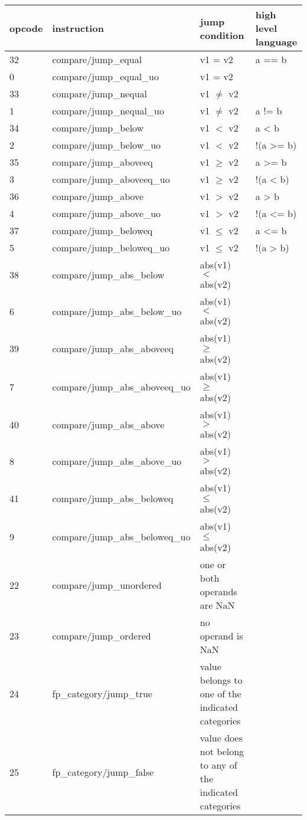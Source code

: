 \documentclass[forwardcom.tex]{subfiles}
\begin{document}
\label{table:floatCompareJumpInstructions}
\begin{tabular}{|p{12mm}|p{60mm}|p{50mm}|p{30mm}|}
\hline
\bfseries opcode & \bfseries instruction & \bfseries jump condition & \bfseries high level \newline language \\ \hline
32 & compare/jump\_equal & v1 = v2 & a == b \\ \hline
0 & compare/jump\_equal\_uo & v1 = v2 &  \\ \hline
33 & compare/jump\_nequal  & v1 $\neq$ v2 &  \\ \hline
1 & compare/jump\_nequal\_uo  & v1 $\neq$ v2 & a != b \\ \hline
34 & compare/jump\_below & v1 $<$ v2 & a < b  \\ \hline
2 & compare/jump\_below\_uo & v1 $<$ v2 & !(a >= b)  \\ \hline
35 & compare/jump\_aboveeq & v1 $\geq$ v2 & a >= b  \\ \hline
3 & compare/jump\_aboveeq\_uo & v1 $\geq$ v2 & !(a < b)  \\ \hline
36 & compare/jump\_above & v1 $>$ v2 & a > b  \\ \hline
4 & compare/jump\_above\_uo & v1 $>$ v2 & !(a <= b)   \\ \hline
37 & compare/jump\_beloweq  & v1 $\leq$ v2 & a <= b  \\ \hline
5 & compare/jump\_beloweq\_uo  & v1 $\leq$ v2 & !(a > b)  \\ \hline

38 & compare/jump\_abs\_below & abs(v1) $<$ abs(v2) &   \\ \hline
6 & compare/jump\_abs\_below\_uo & abs(v1) $<$ abs(v2) &   \\ \hline
39 & compare/jump\_abs\_aboveeq & abs(v1) $\geq$ abs(v2) &   \\ \hline
7 & compare/jump\_abs\_aboveeq\_uo & abs(v1) $\geq$ abs(v2) &   \\ \hline
40 & compare/jump\_abs\_above & abs(v1) $>$ abs(v2) &    \\ \hline
8 & compare/jump\_abs\_above\_uo & abs(v1) $>$ abs(v2) &    \\ \hline
41 & compare/jump\_abs\_beloweq  & abs(v1) $\leq$ abs(v2) &   \\ \hline
9 & compare/jump\_abs\_beloweq\_uo  & abs(v1) $\leq$ abs(v2) &   \\ \hline

22 & compare/jump\_unordered & one or both operands are NaN &  \\ \hline
23 & compare/jump\_ordered & no operand is NaN &  \\ \hline


24 & fp\_category/jump\_true & value belongs to one of the indicated categories &   \\ \hline
25 &  fp\_category/jump\_false & value does not belong to any of the indicated categories &  \\ \hline
\hline
\end{tabular}
\vv
\end{document}
